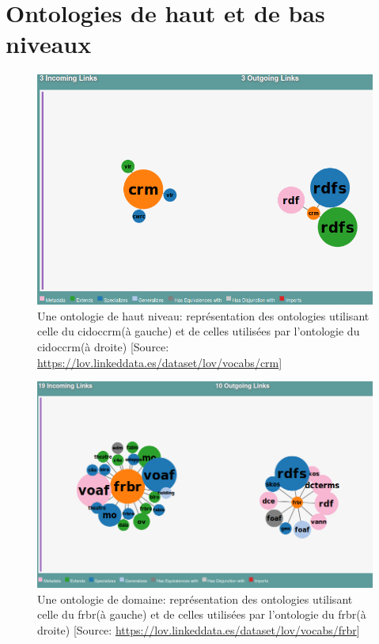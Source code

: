 \chapter{\label{annexe_onto}Ontologies de haut et de bas niveaux}

\begin{figure}[!h]
	\centering
	\includegraphics[width=14cm]{images/onto_crm.png}
	\caption[Une ontologie de haut niveau: CIDOC-CRM]{Une ontologie de haut niveau: représentation des ontologies utilisant celle du \ac{cidoccrm}(à gauche) et de celles utilisées par l'ontologie du \ac{cidoccrm}(à droite) [Source: \url{https://lov.linkeddata.es/dataset/lov/vocabs/crm}]}
	\label{onto_crm}
\end{figure}

\begin{figure}[!h]
	\centering
	\includegraphics[width=14cm]{images/onto_frbr.png}
	\caption[Une ontologie de domaine: FRBR]{Une ontologie de domaine: représentation des ontologies utilisant celle du \ac{frbr}(à gauche) et de celles utilisées par l'ontologie du \ac{frbr}(à droite) [Source: \url{https://lov.linkeddata.es/dataset/lov/vocabs/frbr}]}
	\label{onto_frbr}
\end{figure}

